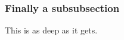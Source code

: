 \documentclass[../../../main.tex]{subfiles}
\begin{document}
\subsubsection{Finally a subsubsection}
This is as deep as it gets.
\end{document}
